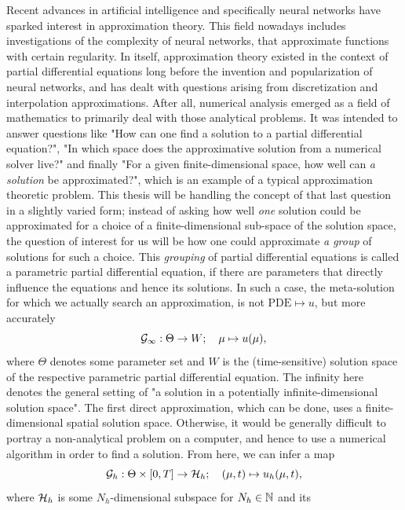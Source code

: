 Recent advances in artificial intelligence and specifically neural networks have sparked interest in approximation
theory. This field nowadays includes investigations of the complexity of neural networks, that
approximate functions with certain regularity.
In itself, approximation theory existed in the context of partial differential equations long before the invention and
popularization of neural networks, and has dealt with questions arising from discretization and interpolation 
approximations. After all, numerical analysis 
emerged as a field of mathematics to primarily deal with those analytical problems. It was intended to answer
questions like "How can one find a solution to a partial differential equation?", "In which space does the 
approximative solution from a numerical solver live?" 
and finally "For a given finite-dimensional space, how well can \emph{a solution} be approximated?", which is an example
of a typical approximation theoretic problem. 
This thesis will be handling the concept of that last question in a slightly varied form; instead 
of asking how well \emph{one} solution could be approximated for a choice of a finite-dimensional sub-space of
the solution space, the question of interest for us will be how one could approximate \emph{a group} of solutions
for such a choice.
This \emph{grouping} of partial differential equations is called a parametric partial differential equation, if
there are parameters that directly influence the equations and hence its solutions. In such a case,
the meta-solution for which we actually search an approximation, is not $\text{PDE} \mapsto u$, but more accurately
\begin{equation*}
    \mathcal{G}_\infty: \Theta \to W; \quad \mu \mapsto u(\mu),
\end{equation*}
where $\Theta$ denotes some parameter set and $W$ is the (time-sensitive) solution space of the respective parametric partial
differential equation. The infinity here denotes the general setting of "a solution in a 
potentially infinite-dimensional solution space". The first direct approximation, which can be done,
uses a finite-dimensional spatial solution space. Otherwise, it would be generally difficult to
portray a non-analytical problem on a computer, and hence to use a numerical algorithm in order to find a solution.
From here, we can infer a map
\begin{equation*}
    \mathcal{G}_h: \Theta \times [0, T] \to \mathcal{H}_h; \quad (\mu, t) \mapsto u_h(\mu, t), 
\end{equation*}
where $\mathcal{H}_h$ is some $N_h$-dimensional subspace for $N_h \in \mathbb{N}$ and its 

